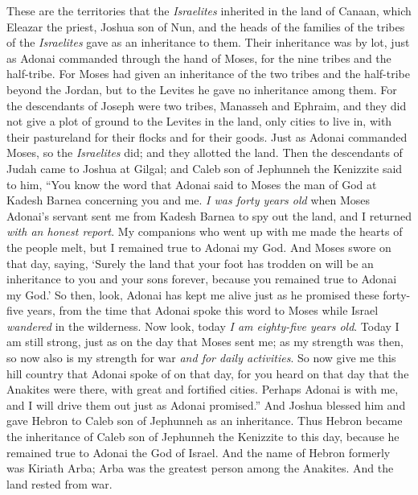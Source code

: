 \begin{biblechapter} %
 These are the territories that the \textit{Israelites} inherited in the land of Canaan, which Eleazar the priest, Joshua son of Nun, and the heads of the families of the tribes of the \textit{Israelites} gave as an inheritance to them.
\verse Their inheritance was by lot, just as Adonai commanded through the hand of Moses, for the nine tribes and the half-tribe.
\verse For Moses had given an inheritance of the two tribes and the half-tribe beyond the Jordan, but to the Levites he gave no inheritance among them.
\verse For the descendants of Joseph were two tribes, Manasseh and Ephraim, and they did not give a plot of ground to the Levites in the land, only cities to live in, with their pastureland for their flocks and for their goods.
\verse Just as Adonai commanded Moses, so the \textit{Israelites} did; and they allotted the land.
 Then the descendants of Judah came to Joshua at Gilgal; and Caleb son of Jephunneh the Kenizzite said to him, “You know the word that Adonai said to Moses the man of God at Kadesh Barnea concerning you and me.
\verse \textit{I was forty years old} when Moses Adonai’s servant sent me from Kadesh Barnea to spy out the land, and I returned \textit{with an honest report}.
\verse My companions who went up with me made the hearts of the people melt, but I remained true to Adonai my God.
\verse And Moses swore on that day, saying, ‘Surely the land that your foot has trodden on will be an inheritance to you and your sons forever, because you remained true to Adonai my God.’
\verse So then, look, Adonai has kept me alive just as he promised these forty-five years, from the time that Adonai spoke this word to Moses while Israel \textit{wandered} in the wilderness. Now look, today \textit{I am eighty-five years old}.
\verse Today I am still strong, just as on the day that Moses sent me; as my strength was then, so now also is my strength for war \textit{and for daily activities}.
\verse So now give me this hill country that Adonai spoke of on that day, for you heard on that day that the Anakites were there, with great and fortified cities. Perhaps Adonai is with me, and I will drive them out just as Adonai promised.”
\verse And Joshua blessed him and gave Hebron to Caleb son of Jephunneh as an inheritance.
\verse Thus Hebron became the inheritance of Caleb son of Jephunneh the Kenizzite to this day, because he remained true to Adonai the God of Israel.
\verse And the name of Hebron formerly was Kiriath Arba; Arba was the greatest person among the Anakites. And the land rested from war.
\end{biblechapter}

